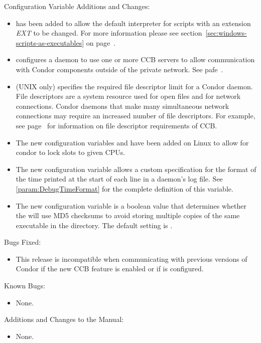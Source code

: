 \noindent Configuration Variable Additions and Changes:

\begin{itemize}

\item {} has been added to allow
the default interpreter for scripts with an extension \textit{EXT} to
be changed.  For more information please see
section~\ref{sec:windows-scripts-as-executables} on
page~\pageref{sec:windows-scripts-as-executables}.

\item {} configures a daemon to use one or more
CCB servers to allow communication with Condor components outside of
the private network.  See pafe~\pageref{sec:CCB}.

\item {} (UNIX only) specifies the
required file descriptor limit for a Condor daemon.  File descriptors
are a system resource used for open files and for network connections.
Condor daemons that make many simultaneous network connections may
require an increased number of file descriptors.  For example, see
page~\pageref{sec:CCB} for information on file descriptor requirements
of CCB.

\item The new configuration variables  and 
 have been added on Linux to allow for
condor to lock slots to given CPUs.

\item The new configuration variable 
  allows a custom specification for the format of the time
  printed at the start of each line in a daemon's log file.
  See \ref{param:DebugTimeFormat} for the complete definition of
  this variable.

\item The new configuration variable 
  is a boolean value that determines whether the  will
  use MD5 checksums to avoid storing multiple copies of the same
  executable in the  directory. The default setting is
  .

\end{itemize}

\noindent Bugs Fixed:

\begin{itemize}

\item This release is incompatible when communicating with previous
versions of Condor if the new CCB feature is enabled or if
 is configured.

\end{itemize}

\noindent Known Bugs:

\begin{itemize}

\item None.

\end{itemize}

\noindent Additions and Changes to the Manual:

\begin{itemize}

\item None.

\end{itemize}
